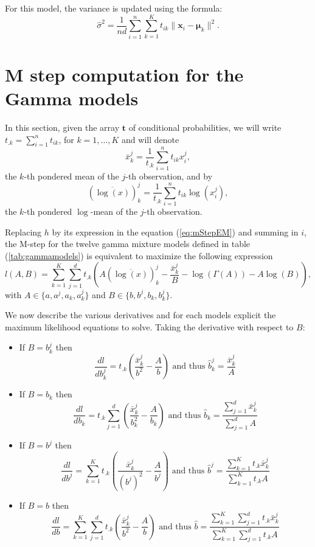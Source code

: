 \documentclass[a4paper,10pt]{article}
\newcommand{\bx}{\mathbf{x}}
\newcommand{\bt}{\mathbf{t}}
\newcommand{\bmu}{\boldsymbol{\mu}}
\begin{document}
For this model, the variance is updated using the formula:
$$
\hat{\sigma}^2 = \frac{1}{nd} \sum_{i=1}^n \sum_{k=1}^K t_{ik} \|\bx_i-\bmu_k\|^2.
$$

\section{M step computation for the Gamma models}
In this section, given the array $\bt$ of conditional probabilities, we will write
$t_{.k} = \sum_{i=1}^n t_{ik}$, for $k=1,\ldots,K$ and will denote
$$
\bar{x}^j_k = \frac{1}{t_{.k}} \sum_{i=1}^n t_{ik} x^j_i,
$$
the $k$-th pondered mean of the $j$-th observation, and by
$$
(\overline{\log(x)})^j_k = \frac{1}{t_{.k}} \sum_{i=1}^n t_{ik} \log(x^j_i),
$$
the $k$-th pondered $\log$-mean of the $j$-th observation.

Replacing $h$ by its expression in the equation (\ref{eq:mStepEM}) and summing
in $i$, the M-step for the twelve gamma mixture models defined in table
 (\ref{tab:gammamodels}) is equivalent to maximize the following expression
\begin{equation}\label{eq:mStep_A_B}
l(A, B) = \sum_{k=1}^K \sum_{j=1}^d t_{.k}\left( A(\overline{\log(x)})^j_k - \frac{\bar{x}^j_k}{B} - \log(\Gamma(A)) - A \log(B) \right),
\end{equation}
with $A\in \{a, a^j, a_k, a^j_k\}$ and $B\in \{b, b^j, b_k, b^j_k\}$.

We now describe the various derivatives and for each models explicit the maximum
likelihood equations to solve. Taking the derivative with respect to $B$:
\begin{itemize}
\item If $B = b^j_k$ then
$$
\frac{dl}{db^j_k} = t_{.k}  \left(\frac{\bar{x}^j_k}{b^2} - \frac{A}{b}\right)
\mbox{ and thus }
\hat{b}^j_k = \frac{\bar{x}^j_k}{A}$$
\item If $B = b_{k}$ then
$$
\frac{dl}{db_k} = t_{.k}  \sum_{j=1}^d \left(\frac{\bar{x}^j_k}{b_k^2} - \frac{A}{b_k}\right)
\mbox{ and thus }
\hat{b}_k = \frac{\sum_{j=1}^d  \bar{x}^j_k}{\sum_{j=1}^d A}$$
\item If $B = b^j$ then
$$
\frac{dl}{db^j} = \sum_{k=1}^K t_{.k}  \left(\frac{\bar{x}^j_k}{(b^{j})^2} - \frac{A}{b^j}\right)
\mbox{ and thus }
\hat{b}^j = \frac{\sum_{k=1}^K t_{.k} \bar{x}^j_k}{\sum_{k=1}^K t_{.k} A}$$
\item If $B = b$ then
$$
\frac{dl}{db} = \sum_{k=1}^K \sum_{j=1}^d t_{.k}  \left(\frac{\bar{x}^j_k}{b^2} - \frac{A}{b}\right)
\mbox{ and thus }
\hat{b} = \frac{\sum_{k=1}^K \sum_{j=1}^d t_{.k} \bar{x}^j_k}{\sum_{k=1}^K \sum_{j=1}^d t_{.k} A}$$
\end{itemize}
\end{document}
